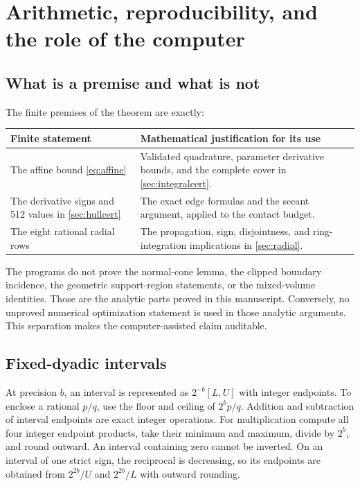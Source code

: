 \documentclass[11pt]{article}
\numberwithin{equation}{section}
\theoremstyle{definition}\newtheorem{definition}[theorem]{Definition}
\theoremstyle{remark}\newtheorem{remark}[theorem]{Remark}
\begin{document}
\section{Arithmetic, reproducibility, and the role of the computer}\label{sec:verification}
\subsection{What is a premise and what is not}
The finite premises of the theorem are exactly:
\begin{center}
\begin{tabular}{@{}p{}p{}@{}}
\toprule
Finite statement & Mathematical justification for its use\\
\midrule
The affine bound \cref{eq:affine} & Validated quadrature, parameter derivative
bounds, and the complete cover in \cref{sec:integralcert}.\\[4pt]
The derivative signs and 512 values in \cref{sec:hullcert} & The exact edge
formulas and the secant argument, applied to the contact budget.\\[4pt]
The eight rational radial rows & The propagation, sign, disjointness, and
ring-integration implications in \cref{sec:radial}.\\
\bottomrule
\end{tabular}
\end{center}
The programs do not prove the normal-cone lemma, the clipped boundary
incidence, the geometric support-region statements, or the mixed-volume
identities. Those are the analytic parts proved in this manuscript. Conversely,
no unproved numerical optimization statement is used in those analytic
arguments. This separation makes the computer-assisted claim auditable.

\subsection{Fixed-dyadic intervals}
At precision $b$, an interval is represented as $2^{-b}[L,U]$ with integer
endpoints. To enclose a rational $p/q$, use the floor and ceiling of
$2^bp/q$. Addition and subtraction of interval endpoints are exact integer
operations. For multiplication compute all four integer endpoint products,
take their minimum and maximum, divide by $2^b$, and round outward. An
interval containing zero cannot be inverted. On an interval of one strict
sign, the reciprocal is decreasing, so its endpoints are obtained from
$2^{2b}/U$ and $2^{2b}/L$ with outward rounding.
\end{document}
